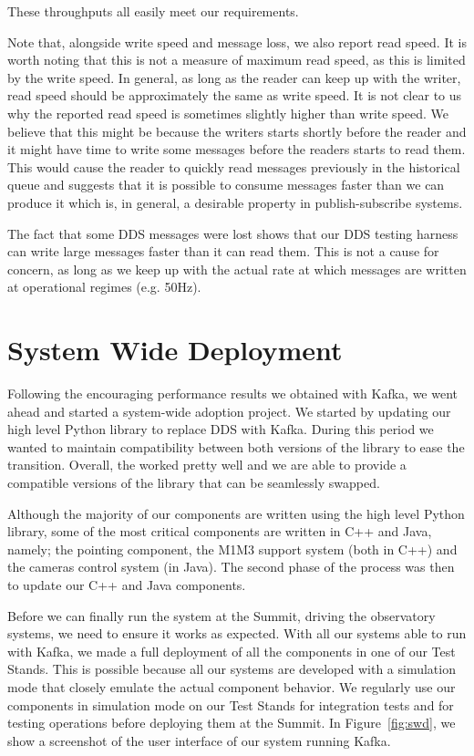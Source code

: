 \documentclass[]{spie}  %
\begin{document}
These throughputs all easily meet our requirements.

Note that, alongside write speed and message loss, we also report read speed.
It is worth noting that this is not a measure of maximum read speed, as this is limited by the write speed.
In general, as long as the reader can keep up with the writer, read speed should be approximately the same as write speed.
It is not clear to us why the reported read speed is sometimes slightly higher than write speed.
We believe that this might be because the writers starts shortly before the reader and it might have time to write some messages before the readers starts to read them.
This would cause the reader to quickly read messages previously in the historical queue and suggests that it is possible to consume messages faster than we can produce it which is, in general, a desirable property in publish-subscribe systems.

The fact that some DDS messages were lost shows that our DDS testing harness can write large messages faster than it can read them.
This is not a cause for concern, as long as we keep up with the actual rate at which messages are written at operational regimes (e.g. 50Hz).

\section{System Wide Deployment}
\label{sec:swd}

Following the encouraging performance results we obtained with Kafka, we went ahead and started a system-wide adoption project.
We started by updating our high level Python library to replace DDS with Kafka.
During this period we wanted to maintain compatibility between both versions of the library to ease the transition.
Overall, the worked pretty well and we are able to provide a compatible versions of the library that can be seamlessly swapped.

Although the majority of our components are written using the high level Python library, some of the most critical components are written in C++ and Java, namely; the pointing component, the M1M3 support system (both in C++) and the cameras control system (in Java).
The second phase of the process was then to update our C++ and Java components.

Before we can finally run the system at the Summit, driving the observatory systems, we need to ensure it works as expected.
With all our systems able to run with Kafka, we made a full deployment of all the components in one of our Test Stands.
This is possible because all our systems are developed with a simulation mode that closely emulate the actual component behavior.
We regularly use our components in simulation mode on our Test Stands for integration tests and for testing operations before deploying them at the Summit.
In Figure~\ref{fig:swd}, we show a screenshot of the user interface of our system running Kafka.
\end{document}
